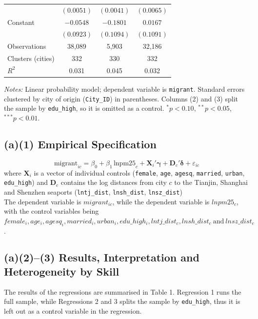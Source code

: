 \documentclass[11pt]{article}
\begin{document}
\begin{table}[H]
\begin{threeparttable}
\begin{tabular}{lccc}
 & $(0.0051)$ & $(0.0041)$ & $(0.0065)$ \\
Constant & $-0.0548$ & $-0.1801$ & $0.0167$ \\
 & $(0.0923)$ & $(0.1094)$ & $(0.1091)$ \\
\midrule
Observations & 38,089 & 5,903 & 32,186 \\
Clusters (cities) & 332 & 330 & 332 \\
$R^2$ & 0.031 & 0.045 & 0.032 \\
\bottomrule
\end{tabular}
\begin{tablenotes}\footnotesize
\item \textit{Notes:} Linear probability model; dependent variable is \texttt{migrant}. Standard errors clustered by city of origin (\texttt{City\_ID}) in parentheses. Columns (2) and (3) split the sample by \texttt{edu\_high}, so it is omitted as a control. $^{*}p<0.10$, $^{**}p<0.05$, $^{***}p<0.01$.
\end{tablenotes}
\end{threeparttable}
\end{table}

\subsection*{(a)(1) Empirical Specification}
\begin{equation}
  \label{eq:ols}
  \text{migrant}_{ic} = \beta_0 + \beta_1 \,\text{lnpm25}_c + \mathbf{X}_i'\boldsymbol{\gamma} + \mathbf{D}_c'\boldsymbol{\delta} + \varepsilon_{ic}
\end{equation}
where $\mathbf{X}_i$ is a vector of individual controls (\texttt{female}, \texttt{age}, \texttt{agesq}, \texttt{married}, \texttt{urban}, \texttt{edu\_high}) and $\mathbf{D}_c$ contains the log distances from city $c$ to the Tianjin, Shanghai and Shenzhen seaports (\texttt{lntj\_dist}, \texttt{lnsh\_dist}, \texttt{lnsz\_dist})\\

\noindent The dependent variable is $migrant_{ic}$, while the dependent variable is $lnpm25_{c}$, with the control variables being $female_i, age_i, agesq_i, married_i, urban_i, edu\_high_i, lntj\_dist_c, lnsh\_dist_c\ \text{and}\ lnsz\_dist_c$.

\subsection*{(a)(2)--(3) Results, Interpretation and Heterogeneity by Skill}
The results of the regressions are summarised in Table 1. Regression 1 runs the full sample, while Regressions 2 and 3 splits the sample by \texttt{edu\_high}, thus it is left out as a control variable in the regression.\\
\end{document}
